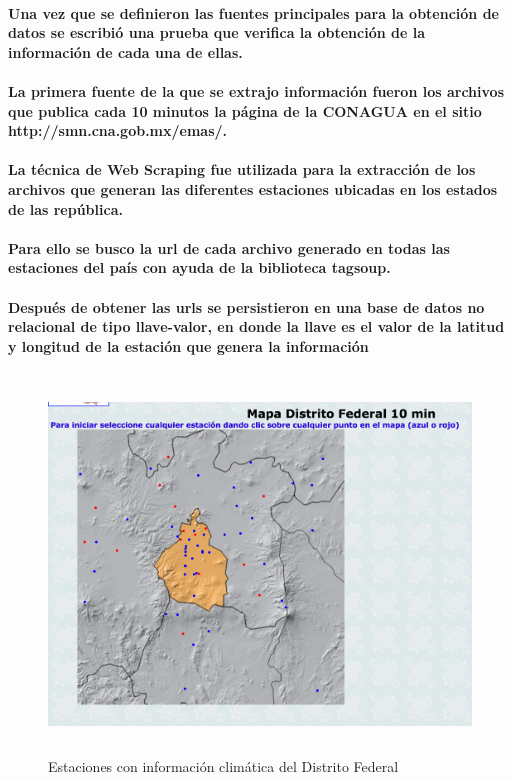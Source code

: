    \paragraph{Una vez que se definieron las fuentes principales para la obtención de datos se escribió una prueba que verifica la obtención de la información de cada una de ellas.} 
    \paragraph{La primera fuente de la que se extrajo información fueron los archivos que publica cada 10 minutos la página de la CONAGUA en el sitio \textbf{http://smn.cna.gob.mx/emas/}.}
    \paragraph{La técnica de Web Scraping fue utilizada para la extracción de los archivos que generan las diferentes estaciones ubicadas en los estados de las república.}
    \paragraph{Para ello se busco la url de cada archivo generado en todas las estaciones del país con ayuda de la biblioteca \textbf{tagsoup}.}
    \paragraph{Después de obtener las urls se persistieron en una base de datos no relacional de tipo llave-valor, en donde la llave es el valor de la latitud y longitud de la estación que genera la información}
    \begin{figure}[b!]
    \begin{center}
      \includegraphics[width=14cm,height=10cm]{./images/DF_Stations}
      \caption{Estaciones con información climática del Distrito Federal}
    \end{center}
    \end{figure}
